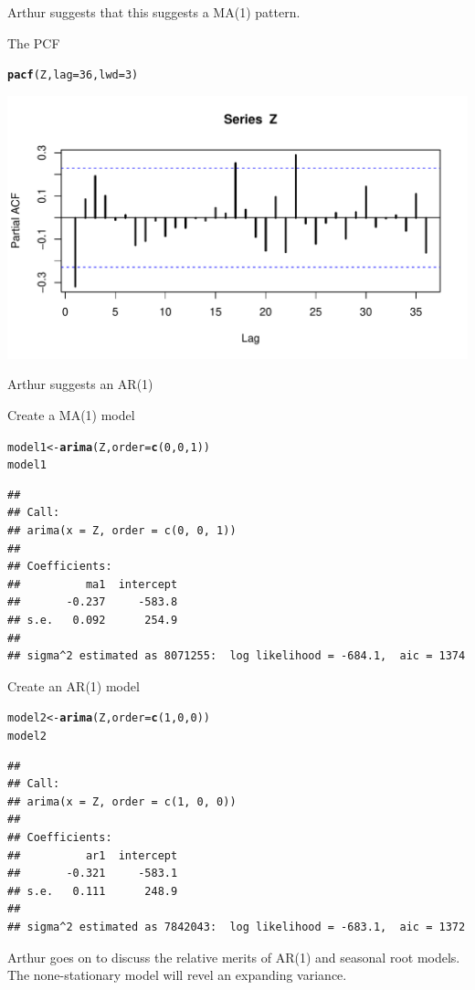 \documentclass[12pt, a4paper, oneside]{article}\usepackage[]{graphicx}\usepackage[]{color}
\makeatletter
\def\maxwidth{ %
  \ifdim\Gin@nat@width>\linewidth
    \linewidth
  \else
    \Gin@nat@width
  \fi
}
\newcommand{\hlkwd}[1]{\textcolor[rgb]{0.737,0.353,0.396}{\textbf{#1}}}%
\newenvironment{kframe}{%
 \def\at@end@of@kframe{}%
 \ifinner\ifhmode%
  \def\at@end@of@kframe{\end{minipage}}%
  \begin{minipage}{\columnwidth}%
 \fi\fi%
 \def\FrameCommand##1{\hskip\@totalleftmargin \hskip-\fboxsep
 \colorbox{shadecolor}{##1}\hskip-\fboxsep
     \hskip-\linewidth \hskip-\@totalleftmargin \hskip\columnwidth}%
 \MakeFramed {\advance\hsize-\width
   \@totalleftmargin\z@ \linewidth\hsize
   \@setminipage}}%
 {\par\unskip\endMakeFramed%
 \at@end@of@kframe}
\newenvironment{knitrout}{}{} %
\makeatother
\begin{document}
Arthur suggests that this suggests a MA(1) pattern. 

The PCF
\begin{knitrout}
\color{fgcolor}\begin{kframe}
\begin{alltt}
\hlkwd{pacf}(Z, lag = 36, lwd = 3)
\end{alltt}
\end{kframe}
\includegraphics[width=\maxwidth]{figure/pacf} 

\end{knitrout}

Arthur suggests an AR(1)

Create a MA(1) model
\begin{knitrout}
\color{fgcolor}\begin{kframe}
\begin{alltt}
model1 <- \hlkwd{arima}(Z, order = \hlkwd{c}(0, 0, 1))
model1
\end{alltt}
\begin{verbatim}
## 
## Call:
## arima(x = Z, order = c(0, 0, 1))
## 
## Coefficients:
##          ma1  intercept
##       -0.237     -583.8
## s.e.   0.092      254.9
## 
## sigma^2 estimated as 8071255:  log likelihood = -684.1,  aic = 1374
\end{verbatim}
\end{kframe}
\end{knitrout}


Create an AR(1) model
\begin{knitrout}
\color{fgcolor}\begin{kframe}
\begin{alltt}
model2 <- \hlkwd{arima}(Z, order = \hlkwd{c}(1, 0, 0))
model2
\end{alltt}
\begin{verbatim}
## 
## Call:
## arima(x = Z, order = c(1, 0, 0))
## 
## Coefficients:
##          ar1  intercept
##       -0.321     -583.1
## s.e.   0.111      248.9
## 
## sigma^2 estimated as 7842043:  log likelihood = -683.1,  aic = 1372
\end{verbatim}
\end{kframe}
\end{knitrout}

Arthur goes on to discuss the relative merits of AR(1) and seasonal root models.  The none-stationary model will revel an expanding variance.
\end{document}
